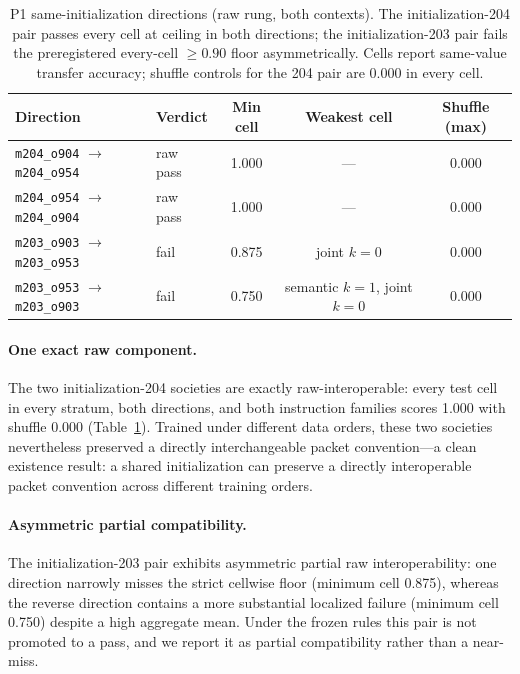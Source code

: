 \documentclass[11pt]{article}
\newcommand{\ckpt}[1]{\texttt{#1}}
\begin{document}
\begin{table}[t]
\centering
\caption{P1 same-initialization directions (raw rung, both contexts). The initialization-204 pair passes every cell at ceiling in both directions; the initialization-203 pair fails the preregistered every-cell $\geq0.90$ floor asymmetrically. Cells report same-value transfer accuracy; shuffle controls for the 204 pair are 0.000 in every cell.}
\label{tab:p1same}
\begin{tabular}{llccc}
\toprule
Direction & Verdict & Min cell & Weakest cell & Shuffle (max) \\
\midrule
\ckpt{m204\_o904} $\to$ \ckpt{m204\_o954} & raw pass & 1.000 & --- & 0.000 \\
\ckpt{m204\_o954} $\to$ \ckpt{m204\_o904} & raw pass & 1.000 & --- & 0.000 \\
\ckpt{m203\_o903} $\to$ \ckpt{m203\_o953} & fail & 0.875 & joint $k{=}0$ & 0.000 \\
\ckpt{m203\_o953} $\to$ \ckpt{m203\_o903} & fail & 0.750 & semantic $k{=}1$, joint $k{=}0$ & 0.000 \\
\bottomrule
\end{tabular}
\end{table}

\paragraph{One exact raw component.} The two initialization-204 societies are exactly raw-interoperable: every test cell in every stratum, both directions, and both instruction families scores 1.000 with shuffle 0.000 (Table~\ref{tab:p1same}). Trained under different data orders, these two societies nevertheless preserved a directly interchangeable packet convention---a clean existence result: a shared initialization can preserve a directly interoperable packet convention across different training orders.

\paragraph{Asymmetric partial compatibility.} The initialization-203 pair exhibits asymmetric partial raw interoperability: one direction narrowly misses the strict cellwise floor (minimum cell 0.875), whereas the reverse direction contains a more substantial localized failure (minimum cell 0.750) despite a high aggregate mean. Under the frozen rules this pair is not promoted to a pass, and we report it as partial compatibility rather than a near-miss.
\end{document}
